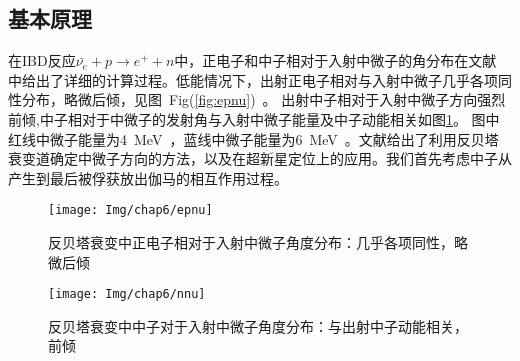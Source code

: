 \subsection{基本原理}
在IBD反应$\bar{\nu_e} + p \rightarrow e^+ + n$中，正电子和中子相对于入射中微子的角分布在文献\citep{vogel1999angular} 中给出了详细的计算过程。低能情况下，出射正电子相对与入射中微子几乎各项同性分布，略微后倾，见图~Fig(\ref{fig:epnu})~。 出射中子相对于入射中微子方向强烈前倾,中子相对于中微子的发射角与入射中微子能量及中子动能相关如图\ref{fig:nnu}。 图中红线中微子能量为4~MeV~，蓝线中微子能量为6~MeV~。文献\citep{apollonio1999determination}给出了利用反贝塔衰变道确定中微子方向的方法，以及在超新星定位上的应用。我们首先考虑中子从产生到最后被俘获放出伽马的相互作用过程。
\begin{figure}[!htb]
\begin{minipage}[t]{0.48\linewidth}
  \centering
   \texttt{[image: Img/chap6/epnu]}
    \caption{反贝塔衰变中正电子相对于入射中微子角度分布：几乎各项同性，略微后倾}
  \label{fig:epnu}
\end{minipage}
\quad
\begin{minipage}[t]{0.48\linewidth}
  \centering
   \texttt{[image: Img/chap6/nnu]}
    \caption{反贝塔衰变中中子对于入射中微子角度分布：与出射中子动能相关，前倾}
  \label{fig:nnu}
\end{minipage}
\end{figure}


